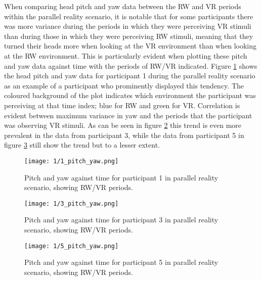When comparing head pitch and yaw data between the RW and VR periods within the parallel reality scenario, it is notable that for some participants there was more variance during the periods in which they were perceiving VR stimuli than during those in which they were perceiving RW stimuli, meaning that they turned their heads more when looking at the VR environment than when looking at the RW environment. This is particularly evident when plotting these pitch and yaw data against time with the periods of RW/VR indicated. Figure \ref{1_pitch_yaw.png} shows the head pitch and yaw data for participant 1 during the parallel reality scenario as an example of a participant who prominently displayed this tendency. The coloured background of the plot indicates which environment the participant was perceiving at that time index; blue for RW and green for VR. Correlation is evident between maximum variance in yaw and the periods that the participant was observing VR stimuli. As can be seen in figure \ref{3_pitch_yaw.png} this trend is even more prevalent in the data from participant 3, while the data from participant 5 in figure \ref{5_pitch_yaw.png} still show the trend but to a lesser extent.

\begin{figure}
	\begin{center}
	\texttt{[image: 1/1\_pitch\_yaw.png]}
	\caption{Pitch and yaw against time for participant 1 in parallel reality scenario, showing RW/VR periods.}
	\label{1_pitch_yaw.png}
	\end{center}
\end{figure}

\begin{figure}
	\begin{center}
	\texttt{[image: 1/3\_pitch\_yaw.png]}
	\caption{Pitch and yaw against time for participant 3 in parallel reality scenario, showing RW/VR periods.}
	\label{3_pitch_yaw.png}
	\end{center}
\end{figure}

\begin{figure}
	\begin{center}
	\texttt{[image: 1/5\_pitch\_yaw.png]}
	\caption{Pitch and yaw against time for participant 5 in parallel reality scenario, showing RW/VR periods.}
	\label{5_pitch_yaw.png}
	\end{center}
\end{figure}

